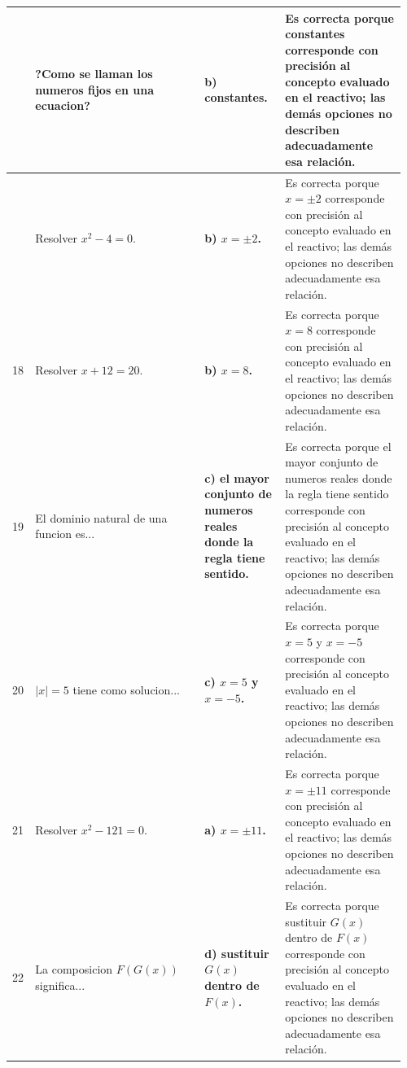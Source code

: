 \documentclass[
	spanish,
	letterpaper, oneside
]{article}
\begin{document}
\begin{landscape}
\begin{longtable}{@{}>{\centering\arraybackslash}p{0.035\linewidth}>{\raggedright\arraybackslash}p{0.42\linewidth}>{\raggedright\arraybackslash}p{0.20\linewidth}>{\raggedright\arraybackslash}p{0.30\linewidth}@{}}
16 & ?Como se llaman los numeros fijos en una ecuacion? & \textbf{b) constantes.} & Es correcta porque constantes corresponde con precisión al concepto evaluado en el reactivo; las demás opciones no describen adecuadamente esa relación. \\
\midrule
17 & Resolver $x^2-4=0$. & \textbf{b) $x=\pm 2$.} & Es correcta porque $x=\pm 2$ corresponde con precisión al concepto evaluado en el reactivo; las demás opciones no describen adecuadamente esa relación. \\
\midrule
18 & Resolver $x+12=20$. & \textbf{b) $x=8$.} & Es correcta porque $x=8$ corresponde con precisión al concepto evaluado en el reactivo; las demás opciones no describen adecuadamente esa relación. \\
\midrule
19 & El dominio natural de una funcion es... & \textbf{c) el mayor conjunto de numeros reales donde la regla tiene sentido.} & Es correcta porque el mayor conjunto de numeros reales donde la regla tiene sentido corresponde con precisión al concepto evaluado en el reactivo; las demás opciones no describen adecuadamente esa relación. \\
\midrule
20 & $|x|=5$ tiene como solucion... & \textbf{c) $x=5$ y $x=-5$.} & Es correcta porque $x=5$ y $x=-5$ corresponde con precisión al concepto evaluado en el reactivo; las demás opciones no describen adecuadamente esa relación. \\
\midrule
21 & Resolver $x^2-121=0$. & \textbf{a) $x=\pm 11$.} & Es correcta porque $x=\pm 11$ corresponde con precisión al concepto evaluado en el reactivo; las demás opciones no describen adecuadamente esa relación. \\
\midrule
22 & La composicion $F(G(x))$ significa... & \textbf{d) sustituir $G(x)$ dentro de $F(x)$.} & Es correcta porque sustituir $G(x)$ dentro de $F(x)$ corresponde con precisión al concepto evaluado en el reactivo; las demás opciones no describen adecuadamente esa relación. \\

\end{longtable}
\end{landscape}
\end{document}
